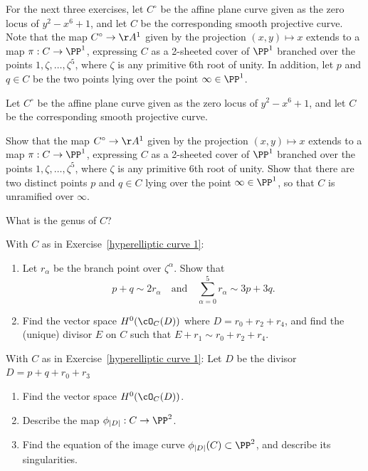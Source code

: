 For the next three exercises, let $C^\circ$ be the affine plane curve given as the zero locus of $y^2 - x^6 +1$, and let $C$ be the corresponding smooth projective curve. Note that the map $C^\circ \to \AA^1$ given by the projection $(x,y) \mapsto x$ extends to a map $\pi : C \to \PP^1$, expressing $C$ as a 2-sheeted cover of $\PP^1$ branched over the points $1, \zeta, \dots, \zeta^5$, where $\zeta$ is any primitive 6th root of unity. In addition, let $p$ and $q \in C$ be the two points lying over the point $\infty \in \PP^1$.

\begin{exercise}\label{hyperelliptic curve 1}
Let $C^\circ$ be the affine plane curve given as the zero locus of $y^2 - x^6 +1$, and let $C$ be the corresponding smooth projective curve. 

Show  that the map $C^\circ \to \AA^1$ given by the projection $(x,y) \mapsto x$ extends to a map $\pi : C \to \PP^1$, expressing $C$ as a 2-sheeted cover of $\PP^1$ branched over the points $1, \zeta, \dots, \zeta^5$, where $\zeta$ is any primitive 6th root of unity. Show that there are two distinct points $p$ and $q \in C$  lying over the point $\infty \in \PP^1$,
so that $C$ is unramified over $\infty$.

What is the genus of $C$?
\end{exercise}

\begin{exercise} With $C$ as in Exercise~\ref{hyperelliptic curve 1}:
\begin{enumerate}

\item Let $r_\alpha$ be the branch point over $\zeta^\alpha$. Show that
$$
p+q \sim 2r_\alpha \quad \text{and} \quad \sum_{\alpha = 0}^5 r_\alpha \sim 3p+3q.
$$

\item Find the vector space $H^0(\cO_C(D))$ where $D = r_0 + r_2 + r_4$, and find the (unique) divisor $E$ on $C$ such that $E + r_1 \sim r_0 + r_2 + r_4$.

\end{enumerate}

\end{exercise}

\begin{exercise}
With $C$ as in Exercise~\ref{hyperelliptic curve 1}:
Let $D$ be the divisor $D = p + q + r_0 + r_3$
\begin{enumerate}
\item Find the vector space $H^0(\cO_C(D))$.
\item Describe the map $\phi_{|D|} : C \to \PP^2$.
\item Find the equation of the image curve $\phi_{|D|}(C) \subset \PP^2$, and describe its singularities.
\end{enumerate}
\end{exercise}
 
